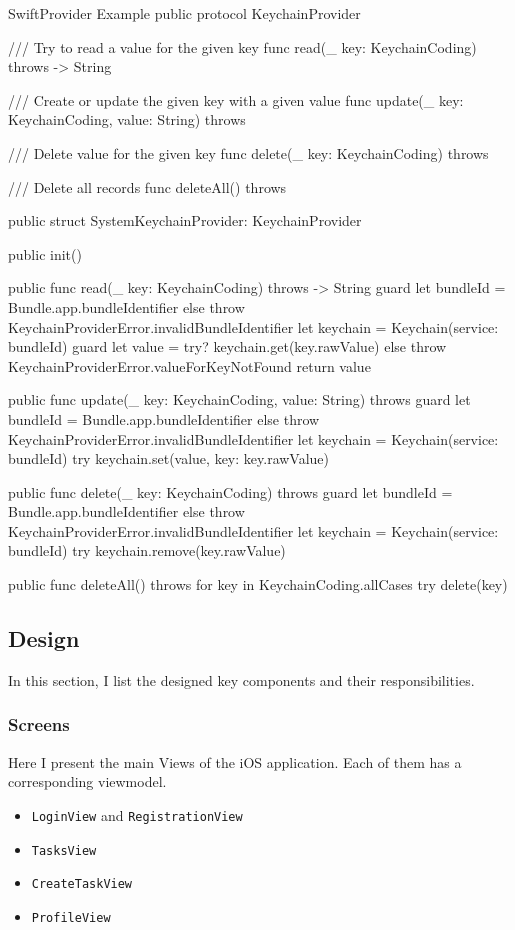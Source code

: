 \documentclass[
  biblatex = false,
  language=english,
  figures=false,
  sourcecodes,
  glossaries,
  index
]{kidiplom}
\begin{document}
\begin{kicode}{Swift}{}{Provider Example}
public protocol KeychainProvider {
    
    /// Try to read a value for the given key
    func read(_ key: KeychainCoding) throws -> String

    /// Create or update the given key with a given value
    func update(_ key: KeychainCoding, value: String) throws

    /// Delete value for the given key
    func delete(_ key: KeychainCoding) throws

    /// Delete all records
    func deleteAll() throws
}

public struct SystemKeychainProvider: KeychainProvider {
    public init() {}
    
    public func read(_ key: KeychainCoding) throws -> String {
        guard let bundleId = Bundle.app.bundleIdentifier else { throw KeychainProviderError.invalidBundleIdentifier }
        let keychain = Keychain(service: bundleId)
        guard let value = try? keychain.get(key.rawValue) else { throw KeychainProviderError.valueForKeyNotFound }
        return value
    }
    
    public func update(_ key: KeychainCoding, value: String) throws {
        guard let bundleId = Bundle.app.bundleIdentifier else { throw KeychainProviderError.invalidBundleIdentifier }
        let keychain = Keychain(service: bundleId)
        try keychain.set(value, key: key.rawValue)
    }
    
    public func delete(_ key: KeychainCoding) throws {
        guard let bundleId = Bundle.app.bundleIdentifier else { throw KeychainProviderError.invalidBundleIdentifier }
        let keychain = Keychain(service: bundleId)
        try keychain.remove(key.rawValue)
    }
    
    public func deleteAll() throws {
        for key in KeychainCoding.allCases {
            try delete(key)
        }
    }
}
\end{kicode}

\subsection{Design}
In this section, I list the designed key components and their responsibilities.

\subsubsection{Screens}
Here I present the main Views of the iOS application. Each of them has a corresponding viewmodel.
\begin{itemize}
	\item \texttt{LoginView} and \texttt{RegistrationView}
	\item \texttt{TasksView}
	\item \texttt{CreateTaskView}
	\item \texttt{ProfileView}
\end{itemize}
\end{document}
